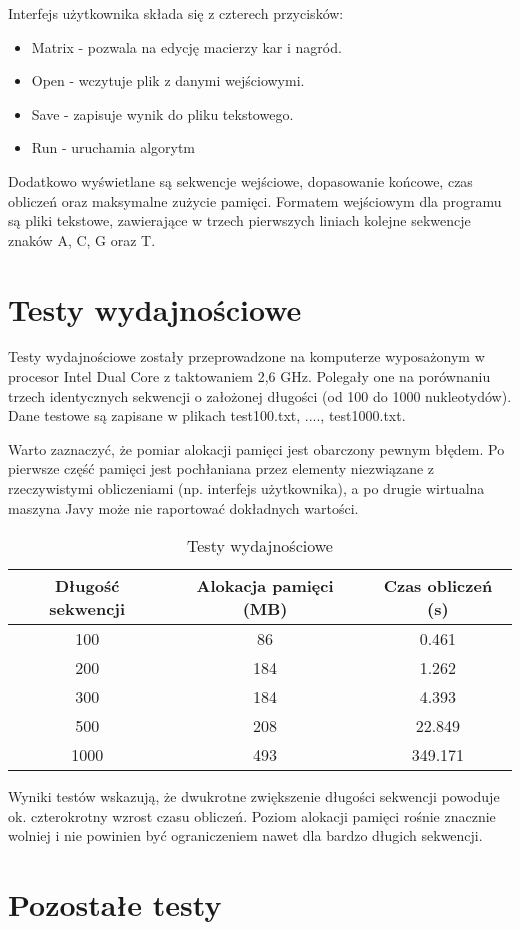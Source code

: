 \documentclass[a4paper,12pt,oneside,notitlepage,onecolumn]{article}
\begin{document}
Interfejs użytkownika składa się z czterech przycisków:
\begin{itemize}
 \item Matrix - pozwala na edycję macierzy kar i nagród.
 \item Open - wczytuje plik z danymi wejściowymi.
 \item Save - zapisuje wynik do pliku tekstowego.
 \item Run - uruchamia algorytm
\end{itemize}
Dodatkowo wyświetlane są sekwencje wejściowe, dopasowanie końcowe, czas obliczeń oraz maksymalne zużycie pamięci.
Formatem wejściowym dla programu są pliki tekstowe, zawierające w trzech pierwszych liniach kolejne sekwencje znaków A, C, G oraz T.

\section{Testy wydajnościowe}
Testy wydajnościowe zostały przeprowadzone na komputerze wyposażonym w procesor Intel Dual Core z taktowaniem 2,6 GHz.
Polegały one na porównaniu trzech identycznych sekwencji o założonej długości (od 100 do 1000 nukleotydów).
Dane testowe są zapisane w plikach test100.txt, ...., test1000.txt.

Warto zaznaczyć, że pomiar alokacji pamięci jest obarczony pewnym błędem.
Po pierwsze część pamięci jest pochłaniana przez elementy niezwiązane z rzeczywistymi obliczeniami (np. interfejs użytkownika), a
po drugie wirtualna maszyna Javy może nie raportować dokładnych wartości.

\begin{table}[t]
\caption{Testy wydajnościowe}
\begin{tabular}{|c|c|c|}
  \hline
  Długość sekwencji & Alokacja pamięci (MB) & Czas obliczeń (s)\\
  \hline
  100 & 86 & 0.461\\
  \hline
  200 & 184 & 1.262 \\
  \hline
  300 & 184 & 4.393 \\
  \hline
  500 & 208 & 22.849 \\
  \hline
  1000 & 493 & 349.171 \\
  \hline
\end{tabular} 
\end{table}

Wyniki testów wskazują, że dwukrotne zwiększenie długości sekwencji powoduje ok. czterokrotny wzrost czasu obliczeń.
Poziom alokacji pamięci rośnie znacznie wolniej i nie powinien być ograniczeniem nawet dla bardzo długich sekwencji.


\section{Pozostałe testy}
\end{document}
